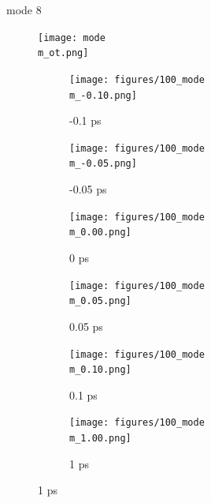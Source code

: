 \documentclass{beamer}
\newcommand\w{0.32}
\begin{document}
\renewcommand\m{8}
\begin{frame}{mode \m}
	\vspace{\vh mm}
\begin{figure}
	\centering
	\texttt{[image: mode\\m\_ot.png]}
\end{figure}
	\begin{figure}
		\centering
		\begin{subfigure}[b]{\w\textwidth}
			\centering
			\texttt{[image: figures/100\_mode\\m\_-0.10.png]}
			\caption{-0.1 ps}
		\end{subfigure}
		\begin{subfigure}[b]{\w\textwidth}
			\centering
			\texttt{[image: figures/100\_mode\\m\_-0.05.png]}
			\caption{-0.05 ps}
		\end{subfigure}
		\begin{subfigure}[b]{\w\textwidth}
			\centering
			\texttt{[image: figures/100\_mode\\m\_0.00.png]}
			\caption{0 ps}
		\end{subfigure}
		\begin{subfigure}[b]{\w\textwidth}
			\centering
			\texttt{[image: figures/100\_mode\\m\_0.05.png]}
			\caption{0.05 ps}
		\end{subfigure}
		\begin{subfigure}[b]{\w\textwidth}
			\centering
			\texttt{[image: figures/100\_mode\\m\_0.10.png]}
			\caption{0.1 ps}
		\end{subfigure}
		\begin{subfigure}[b]{\w\textwidth}
			\centering
			\texttt{[image: figures/100\_mode\\m\_1.00.png]}
			\caption{1 ps}
		\end{subfigure}
	\end{figure}
\end{frame}
\end{document}
